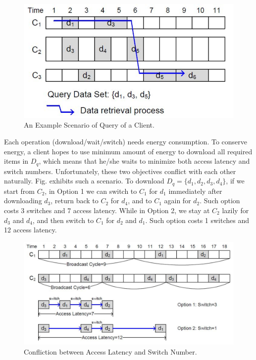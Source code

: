 \documentclass[12pt,a4paper]{article}
\theoremstyle{definition}
\begin{document}
\begin{enumerate}
\begin{figure}[!htbp]
	\centering
	\includegraphics[scale= 0.5]{Fig-Access.pdf}
	\caption{An Example Scenario of Query of a Client.} \label{Fig-Access}
\end{figure}

Each operation (download/wait/switch) needs energy consumption. To conserve energy, a client hopes to use minimum amount of energy to download all required items in $D_q$, which means that he/she waits to minimize both access latency and switch numbers. Unfortunately, these two objectives conflict with each other naturally. Fig. exhibits such a scenario. To download $D_q=\{d_1, d_2, d_3, d_4\}$, if we start from $C_2$, in Option 1 we can switch to $C_1$ for $d_1$ immediately after downloading $d_3$, return back to $C_2$ for $d_4$, and to $C_1$ again for $d_2$. Such option costs 3 switches and 7 access latency. While in Option 2, we stay at $C_2$ lazily for $d_3$ and $d_4$, and then switch to $C_1$ for $d_2$ and $d_1$. Such option costs 1 switches and 12 access latency.


\begin{figure}[!htbp]
	\centering
	\includegraphics[scale= 0.5]{Fig-Conflict.pdf}
	\caption{Confliction between Access Latency and Switch Number.} \label{Fig-Conflict}
\end{figure}


\end{enumerate}
\end{document}

